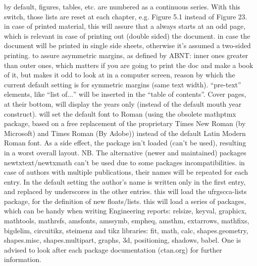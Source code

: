 \documentclass[dctools,english,tocdepth=3,secdepth=3]{ufrgscca} %
\begin{document}
\begin{Options}
	 by default, figures, tables, etc. are numbered as a continuous series. With this switch, those lists are reset at each chapter, e.g. Figure 5.1 instead of Figure 23.
	 in case of printed material, this will assure that a \Macro{\chapter}{} always starts at an odd page, which is relevant in case of printing out (double sided) the document.
	 in case the document will be printed in single side sheets, otherwise it's assumed a two-sided printing.
	 to assure asymmetric margins, as defined by ABNT: inner ones greater than outer ones, which matters if you are going to print the doc and make a book of it, but makes it odd to look at in a computer screen, reason by which the current default setting is for symmetric margins (same text width).
     “pre-text” elements, like “list of$\dots$” will be inserted in the “table of contents”.
     Cover pages, at their bottom, will display the years only (instead of the default mouth year construct).
     will set the default font to Roman (using the obsolete mathptmx package, based on  a free replacement of the proprietary Times New Roman (by Microsoft) and Times Roman (By Adobe)) instead of the default Latin Modern Roman font. As a side effect, the package  isn't loaded (can't be used), resulting in a worst overall layout. NB. The alternative (newer and maintained) packages newtxtext/newtxmath can't be used due to some packages incompatibilities.
	 in case of authors with multiple publications, their names will be repeated for each entry. In the default setting the author's name is written only in the first entry, and replaced by underscores in the other entries.
	 this will load the {\MetaFmt[Pack]\sffamily ufrgscca-lists} package, for the definition of new floats/lists.
	 this will load a series of packages, which can be handy when writing Engineering reports: {\MetaFmt[Pack]\sffamily relsize, keyval, graphicx, mathtools, mathrsfs, amsfonts, amssymb, empheq, amsthm, ext\-arrows, mathfixs, bigdelim, circuitikz, steimenz} and tikz libraries: {\MetaFmt[Pack]\sffamily fit,  math, calc, shapes.geometry, shapes.misc, shapes.multipart, graphs, 3d, positioning, shadows, babel}. One is advised to look after each package documentation (ctan.org) for further information.

\end{Options}
\end{document}
